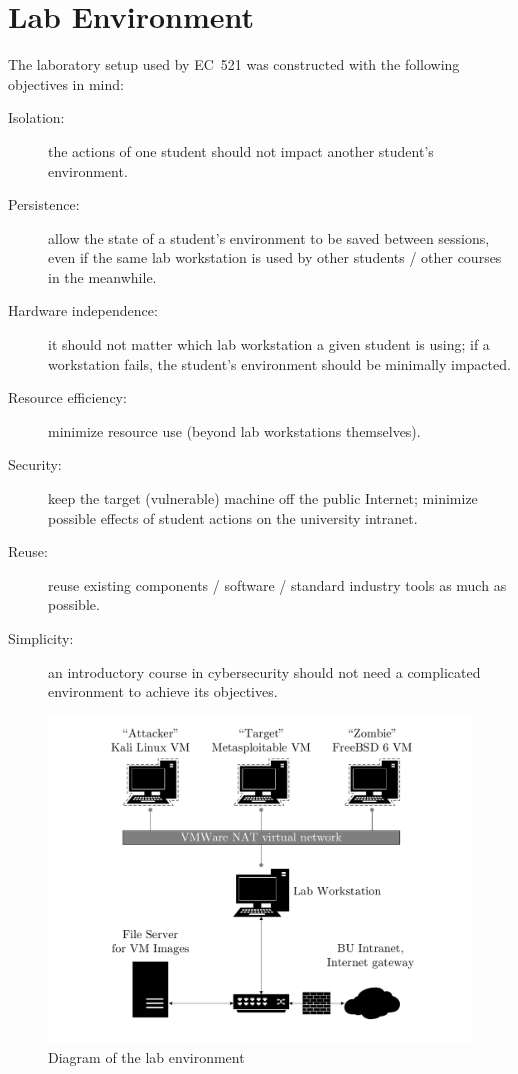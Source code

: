 \documentclass{sig-alternate-2013}
\begin{document}
\section{Lab Environment}
The laboratory setup used by EC~521 was constructed with the following objectives in mind:
\begin{description}
\item[Isolation:] the actions of one student should not impact another student's environment.
\item[Persistence:] allow the state of a student's environment to be saved between sessions, even if
the same lab workstation is used by other students / other courses in the meanwhile.
\item[Hardware independence:] it should not matter which lab workstation a given student is using; if
a workstation fails, the student's environment should be minimally impacted.
\item[Resource efficiency:] minimize resource use (beyond lab workstations themselves). 
\item[Security:] keep the target (vulnerable) machine off the public Internet; minimize possible effects
of student actions on the university intranet.
\item[Reuse:] reuse existing components / software / standard industry tools as much as possible. 
\item[Simplicity:] an introductory course in cybersecurity should not need a complicated environment
to achieve its objectives.
\end{description}

\begin{figure}[b!]
\includegraphics[scale=0.4, clip=true, trim=1.5in 0 0 0]{ec521_hostmap.pdf}
\caption{Diagram of the lab environment}
\label{fig:labenv}
\end{figure}
\end{document}

